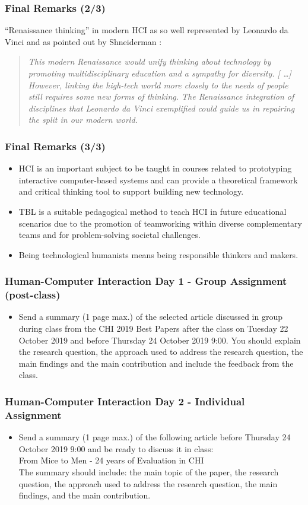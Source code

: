 \documentclass[screen, aspectratio=169]{beamer}
\begin{document}
\begin{frame}
\frametitle{Final Remarks (2/3)}
``Renaissance thinking'' in modern HCI \cite[p.196]{Gross.2014:ICHCI} as so well represented by Leonardo da Vinci and as pointed out by Shneiderman \cite[p.2--3]{Shneiderman.2003:MITPress}:
\begin{quote}
\emph{This modern Renaissance would unify thinking about technology by promoting multidisciplinary education and a sympathy for diversity. [ \ldots ] However, linking the high-tech world more closely to the needs of people still requires some new forms of thinking. The Renaissance integration of disciplines that Leonardo da Vinci exemplified could guide us in repairing the split in our modern world. }
\end{quote}
\end{frame}
%
\begin{frame}
\frametitle{Final Remarks (3/3)}
\begin{itemize}
\item HCI is an important subject to be taught in courses related to prototyping interactive computer-based systems and can provide a theoretical framework and critical thinking tool to support building new technology.
\item TBL is a suitable pedagogical method to teach HCI in future educational scenarios due to the promotion of teamworking within diverse complementary teams and for problem-solving societal challenges.
\item Being technological humanists means being responsible thinkers and makers. 
\end{itemize}
\end{frame}
%
\begin{frame}
\frametitle{Human-Computer Interaction Day 1 - Group Assignment (post-class)}
\begin{itemize}
\item Send a summary (1 page max.) of the selected article discussed in group during class from the CHI 2019 Best Papers after the class on Tuesday 22 October 2019 and before Thursday 24 October 2019 9:00. 
You should explain the research question, the approach used to address the research question, the main findings and the main contribution and include the feedback from the class.
\end{itemize}
\end{frame}
%
\begin{frame}
\frametitle{Human-Computer Interaction Day 2 - Individual Assignment}
\begin{itemize}
\item Send a summary (1 page max.) of the following article before Thursday 24 October 2019 9:00 and be ready to discuss it in class:\\ 
From Mice to Men - 24 years of Evaluation in CHI~\cite{Barkhuus.Rode.2007.evalchi}\\
The summary should include: 
the main topic of the paper,
the research question,
the approach used to address the research question,
the main findings, and
the main contribution.
\end{itemize}
\end{frame}
\end{document}
